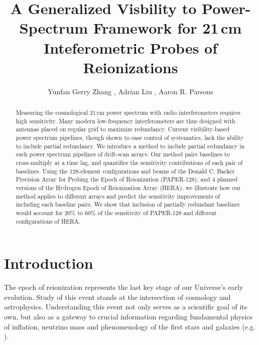 \documentclass[twocolumn,apj,numberedappendix]{emulateapj}
\renewcommand\[{\begin{equation}}
\renewcommand\]{\end{equation}}
\begin{document}
\title{A Generalized Visbility to Power-Spectrum Framework for 21\,cm Inteferometric Probes of Reionizations}

\author{
Yunfan Gerry Zhang ,
Adrian Liu ,
Aaron R. Parsons
}


\begin{abstract}
Measuring the cosmological 21\,cm power spectrum with radio interferometers requires high sensitivity. Many modern low-frequency interferometers are thus designed with antennas placed on regular grid to maximize redundancy. Current visibility-based power spectrum pipelines, though shown to ease control of systematics, lack the ability to include partial redundancy. We introduce a method to include partial redundancy in such power spectrum pipelines of drift-scan arrays. Our method pairs baselines to cross-multiply at a time lag, and quantifies the sensitivity contributions of each pair of baselines. 
Using the 128-element configurations and beams of the Donald C. Backer Precision Array for Probing the Epoch of Reionization (PAPER-128), and 4 planned versions of the Hydrogen Epoch of Reionization Array (HERA), we illustrate how our method applies to different arrays and predict the sensitivity improvements of including each baseline pairs. We show that inclusion of partially redundant baselines 
would account for $20\%$ to $60\%$ of the sensitivity of PAPER-128 and different configurations of HERA. 
\end{abstract}

\section{Introduction}

The epoch of reionization represents the last key
stage of our Universe's early evolution. Study of this event stands at
the intersection of cosmology and astrophysics. Understanding this
event not only serves as a scientific goal
of its own, but also as a gateway to crucial information
regarding fundamental physics of inflation, neutrino mass and phenomenology
of the first stars and galaxies (e.g. \citealt{LiuOpticalDepth, Liu2016b, Mao2008, DEw21cm, Bull2015, Oyama20131186}). 
\end{document}
